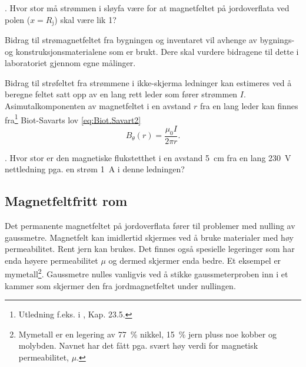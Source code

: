 \documentclass[../Elmag-labhefte-2020.tex]{subfiles}
\begin{document}
{. Hvor stor må strømmen i sløyfa være for at magnetfeltet på jordoverflata ved polen ($x = R_\text{j}$) skal være lik \SI{1}{\gauss}? }


Bidrag til strømagnetfeltet fra bygningen og inventaret vil avhenge av bygnings- og konstruksjonsmaterialene som er brukt. Dere skal vurdere bidragene til dette i laboratoriet gjennom egne målinger.

Bidrag til strøfeltet fra strømmene i ikke-skjerma ledninger kan estimeres ved å beregne feltet satt opp av en lang rett leder som fører strømmen $I$. Asimutalkomponenten av magnetfeltet i en avstand $r$ fra en lang leder kan finnes fra\footnote{Utledning f.eks. i \cite{lillestol}, Kap. 23.5.} Biot-Savarts lov \eqref{eq:Biot.Savart2}
\begin{equation}
    B_\theta (r) = \frac{\mu_0 I}{2\pi r} .
\end{equation}

{. Hvor stor er den magnetiske flukstetthet i en avstand \SI{5}{\cm} fra en lang \SI{230}{\volt} nettledning pga. en strøm \SI{1}{\ampere} i denne ledningen?}

\subsection{Magnetfeltfritt rom \label{ch.mymetall}}

Det permanente magnetfeltet på jordoverflata fører til problemer med nulling av gaussmetre. Magnetfelt kan imidlertid skjermes ved å bruke materialer med høy permeabilitet. Rent jern kan brukes. Det finnes også spesielle legeringer som har enda høyere permeabilitet $\mu$ og dermed skjermer enda bedre. Et eksempel er mymetall\footnote{Mymetall er en legering av \SI{77}{\percent} nikkel, \SI{15}{\percent} jern pluss noe kobber og molybden.  Navnet har det fått pga. svært høy verdi for magnetisk permeabilitet, $\mu$.}. Gaussmetre nulles vanligvis ved å stikke gaussmeterproben inn i et kammer som skjermer den fra jordmagnetfeltet under nullingen. 

\end{document}
